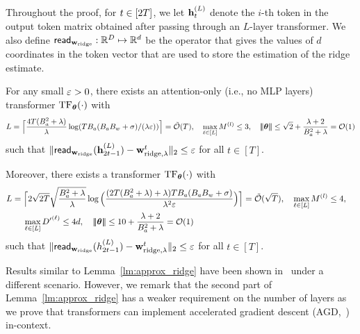 Throughout the proof, for $t\in[2{T}]$,  we let ${\mathbf h}_{t}^{(L)}$ denote the $i$-th token in the output token matrix obtained after passing through an $L$-layer transformer. We also define  ${\sf read}_{{\mathbf w}_{\rm ridge}}: \mathbb{R}^{D}\mapsto\mathbb{R}^{d}$ be the operator that gives the values of  $d$ coordinates  in the token vector that are used to store the estimation of  the ridge estimate.


\begin{lemma}\label{lm:approx_ridge}
For any small $\varepsilon>0$, there exists an attention-only (i.e., no MLP layers) transformer ${\rm TF}_{\boldsymbol \theta}(\cdot)$ with
$$L=\Big\lceil\frac{4T(B_a^2+\lambda)}{\lambda}\log({TB_a(B_aB_w+\sigma)}/({\lambda}\varepsilon))\Big\rceil={\tilde{\mathcal O}}(T),~~~\max_{\ell\in[L]}M^{(l)}\leq3,~~~ {\left|\!\left|\!\left|{{\boldsymbol \theta}}\right|\!\right|\!\right|}\leq  \sqrt{2}+\frac{\lambda+2}{B_a^2+\lambda}=\mathcal{O}(1)$$ such that $\|{\sf read}_{{\mathbf w}_{{\rm ridge}}}({\mathbf h}_{2t-1}^{(L)})-{\mathbf w}^t_{{\rm ridge},\lambda}\|_2\leq\varepsilon$ for all $t\in[T]$.

Moreover, there exists a  transformer ${\rm TF}_{\boldsymbol \theta}(\cdot)$ with  \begin{align*}&L=\Big\lceil2\sqrt{2T}\sqrt{\frac{B_a^2+\lambda}{\lambda}}\log\Big(\frac{(2T(B_a^2+\lambda)+\lambda)TB_a(B_aB_w+\sigma)}{\lambda^2\eps}\Big)\Big\rceil=\tcO(\sqrt{T}),~~~\max_{\ell\in[L]}M^{(l)}\leq4,~~~ \\
&~~~~~~\max_{\ell\in[L]}\hidden^{\lth}\leq 4d,~~~\nrmp{\btheta}\leq  10+\frac{\lambda+2}{B_a^2+\lambda}=\cO(1) \end{align*}
 such that $\|{\sf read}_{{\mathbf w}_{{\rm ridge}}}(h_{2t-1}^{(L)})-{\mathbf w}^t_{{\rm ridge},\lambda}\|_2\leq\varepsilon$ for all $t\in[T]$.
\end{lemma}


Results similar to Lemma~\ref{lm:approx_ridge} have been shown in~\cite{bai2023transformers} under a different scenario.   However, we remark that  the second part of Lemma~\ref{lm:approx_ridge} has a weaker requirement on the number of layers as we prove that transformers can implement accelerated gradient descent (AGD,~\cite{nesterov2003introductory}) in-context.


